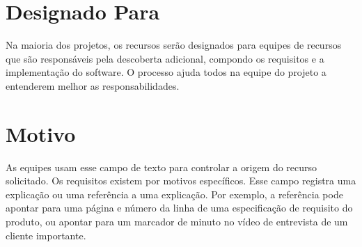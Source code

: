 \documentclass{report}
\begin{document}
\section{Designado Para}

Na maioria dos projetos, os recursos serão designados para equipes de recursos
que são responsáveis pela descoberta adicional, compondo os requisitos e a
implementação do software. O processo ajuda todos na equipe do projeto a
entenderem melhor as responsabilidades.

\section{Motivo}

As equipes usam esse campo de texto para controlar a origem do recurso
solicitado. Os requisitos existem por motivos específicos. Esse campo registra
uma explicação ou uma referência a uma explicação. Por exemplo, a referência
pode apontar para uma página e número da linha de uma especificação de
requisito do produto, ou apontar para um marcador de minuto no vídeo de
entrevista de um cliente importante.
\end{document}
